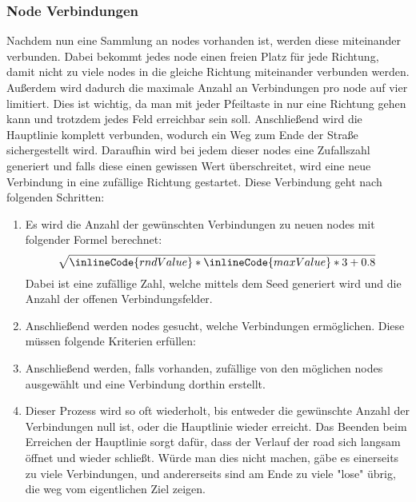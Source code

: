 \subsubsection{Node Verbindungen}\label{subsubsec:node-verbindungen}
Nachdem nun eine Sammlung an nodes vorhanden ist, werden diese miteinander verbunden.
Dabei bekommt jedes node einen freien Platz für jede Richtung, damit nicht zu viele nodes in die gleiche Richtung miteinander verbunden werden.
Außerdem wird dadurch die maximale Anzahl an Verbindungen pro node auf vier limitiert.
Dies ist wichtig, da man mit jeder Pfeiltaste in nur eine Richtung gehen kann und trotzdem jedes Feld erreichbar sein soll.
Anschließend wird die Hauptlinie komplett verbunden, wodurch ein Weg zum Ende der Straße sichergestellt wird.
Daraufhin wird bei jedem dieser nodes eine Zufallszahl generiert und falls diese einen gewissen Wert überschreitet, wird eine neue Verbindung in eine zufällige Richtung gestartet.
Diese Verbindung geht nach folgenden Schritten:
\begin{enumerate}
    \item Es wird die Anzahl der gewünschten Verbindungen zu neuen nodes mit folgender Formel berechnet: \[ \sqrt{\inlineCode{rndValue} * \inlineCode{maxValue} * 3 + 0.8}\]
        Dabei ist  eine zufällige Zahl, welche mittels dem Seed generiert wird und  die Anzahl der offenen Verbindungsfelder.
    \item Anschließend werden nodes gesucht, welche Verbindungen ermöglichen.
    Diese müssen folgende Kriterien erfüllen:
    \item Anschließend werden, falls vorhanden, zufällige von den möglichen nodes ausgewählt und eine Verbindung dorthin erstellt.
    \item Dieser Prozess wird so oft wiederholt, bis entweder die gewünschte Anzahl der Verbindungen null ist, oder die Hauptlinie wieder erreicht.
    Das Beenden beim Erreichen der Hauptlinie sorgt dafür, dass der Verlauf der road sich langsam öffnet und wieder schließt.
    Würde man dies nicht machen, gäbe es einerseits zu viele Verbindungen, und andererseits sind am Ende zu viele "lose" übrig, die weg vom eigentlichen Ziel zeigen.
\end{enumerate}

